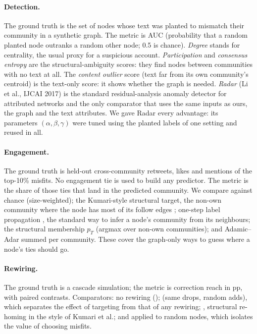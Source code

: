 \paragraph{Detection.}
The ground truth is the set of nodes whose text was planted to mismatch their community in a synthetic graph. The metric is AUC (probability that a random planted node outranks a random other node; 0.5 is chance). \emph{Degree} stands for centrality, the usual proxy for a suspicious account. \emph{Participation} and \emph{consensus entropy} are the structural-ambiguity scores: they find nodes between communities with no text at all. The \emph{content outlier} score (text far from its own community's centroid) is the text-only score: it shows whether the graph is needed. \emph{Radar} (Li et al., IJCAI 2017) \cite{li2017radar} is the standard residual-analysis anomaly detector for attributed networks and the only comparator that uses the same inputs as ours, the graph and the text attributes. We gave Radar every advantage: its parameters $(\alpha,\beta,\gamma)$ were tuned using the planted labels of one setting and reused in all.

\paragraph{Engagement.}
The ground truth is held-out cross-community retweets, likes and mentions of the top-10\% misfits. No engagement tie is used to build any predictor. The metric is the share of those ties that land in the predicted community. We compare against chance (size-weighted); the Kumari-style structural target, the non-own community where the node has most of its follow edges \cite{kumari2021deception}; one-step label propagation \cite{zhu2002label}, the standard way to infer a node's community from its neighbours; the structural membership $p_T$ (argmax over non-own communities); and Adamic--Adar \cite{adamic2003friends} summed per community. These cover the graph-only ways to guess where a node's ties should go.

\paragraph{Rewiring.}
The ground truth is a cascade simulation; the metric is correction reach in pp, with paired contrasts. Comparators: no rewiring ();  (same drops, random adds), which separates the effect of targeting from that of any rewiring; , structural re-homing in the style of Kumari et al.; and  applied to random nodes, which isolates the value of choosing misfits.

